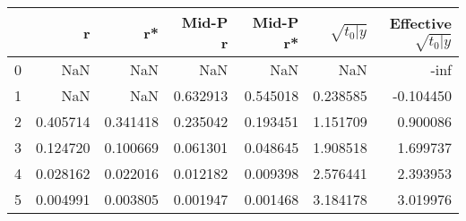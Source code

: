 \begin{tabular}{lrrrrrr}
\toprule
 & r & r* & Mid-P r & Mid-P r* & $\sqrt{t_0\vert y}$ & Effective $\sqrt{t_0\vert y}$ \\
\midrule
0 & NaN & NaN & NaN & NaN & NaN & -inf \\
1 & NaN & NaN & 0.632913 & 0.545018 & 0.238585 & -0.104450 \\
2 & 0.405714 & 0.341418 & 0.235042 & 0.193451 & 1.151709 & 0.900086 \\
3 & 0.124720 & 0.100669 & 0.061301 & 0.048645 & 1.908518 & 1.699737 \\
4 & 0.028162 & 0.022016 & 0.012182 & 0.009398 & 2.576441 & 2.393953 \\
5 & 0.004991 & 0.003805 & 0.001947 & 0.001468 & 3.184178 & 3.019976 \\
\bottomrule
\end{tabular}
